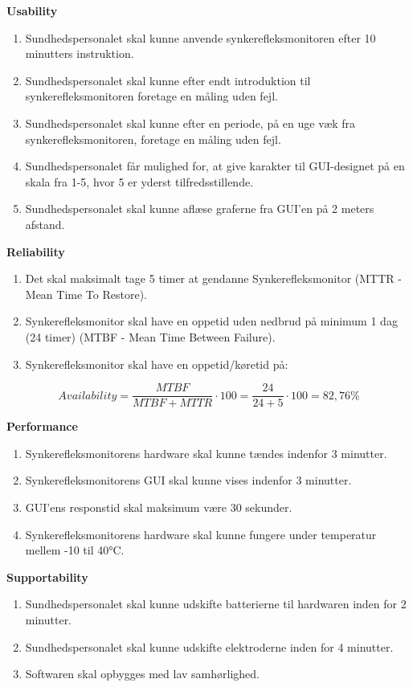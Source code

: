 \textbf{Usability}
\begin{enumerate}
\item Sundhedspersonalet skal kunne anvende synkerefleksmonitoren efter 10 minutters instruktion. 
\item Sundhedspersonalet skal kunne efter endt introduktion til synkerefleksmonitoren foretage en måling uden fejl.
\item Sundhedspersonalet skal kunne efter en periode, på en uge væk fra synkerefleksmonitoren, foretage en måling uden fejl.
\item Sundhedspersonalet får mulighed for, at give karakter til GUI-designet på en skala fra 1-5, hvor 5 er yderst tilfredsstillende.
\item Sundhedspersonalet skal kunne aflæse graferne fra GUI'en på 2 meters afstand. 
\end{enumerate}
                                                                                                
\textbf{Reliability}
\begin{enumerate}[resume]
\item Det skal maksimalt tage 5 timer at gendanne Synkerefleksmonitor (MTTR - Mean Time To Restore).
\item Synkerefleksmonitor skal have en oppetid uden nedbrud på minimum 1 dag (24 timer) (MTBF - Mean Time Between Failure).  
\item Synkerefleksmonitor skal have en oppetid/køretid på: 

\end{enumerate}


\begin{equation}
Availability = \frac{MTBF}{MTBF+MTTR}\cdot100 = \frac{24}{24+5}\cdot100 = 82,76 \%
\end{equation}

					
\textbf{Performance}
\begin{enumerate}[resume]
\item Synkerefleksmonitorens hardware skal kunne tændes indenfor 3 minutter.
\item Synkerefleksmonitorens GUI skal kunne vises indenfor 3 minutter.
\item GUI'ens responstid skal maksimum være 30 sekunder.
\item Synkerefleksmonitorens hardware skal kunne fungere under temperatur mellem  -10  til   \ang{40}C.

\end{enumerate}

\pagebreak
\textbf{Supportability}
\begin{enumerate}[resume]
\item Sundhedspersonalet skal kunne udskifte batterierne til hardwaren inden for 2 minutter.
\item Sundhedspersonalet skal kunne udskifte elektroderne inden for 4 minutter.
\item Softwaren skal opbygges med lav samhørlighed.
\end{enumerate}

\newpage

\newpage
\listoffigures
\newpage
\listoftables

